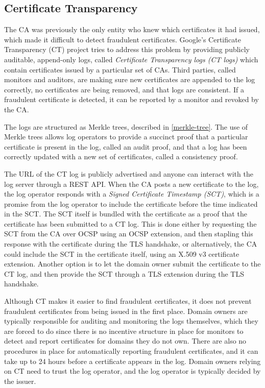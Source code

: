 \documentclass{style/kththesis}
\begin{document}
\subsection{Certificate Transparency}
The CA was previously the only entity who knew which certificates it had issued, which made it difficult to detect fraudulent certificates. Google's Certificate Transparency (CT) project \cite{RFC6962} tries to address this problem by providing publicly auditable, append-only logs, called \emph{Certificate Transparency logs (CT logs)} which contain certificates issued by a particular set of CAs. Third parties, called monitors and auditors, are making sure new certificates are appended to the log correctly, no certificates are being removed, and that logs are consistent. If a fraudulent certificate is detected, it can be reported by a monitor and revoked by the CA. 

The logs are structured as Merkle trees, described in \cref{merkle-tree}. The use of Merkle trees allows log operators to provide a succinct proof that a particular certificate is present in the log, called an audit proof, and that a log has been correctly updated with a new set of certificates, called a consistency proof.

The URL of the CT log is publicly advertised and anyone can interact with the log server through a REST API. When the CA posts a new certificate to the log, the log operator responds with a \emph{Signed Certificate Timestamp (SCT)}, which is a promise from the log operator to include the certificate before the time indicated in the SCT. The SCT itself is bundled with the certificate as a proof that the certificate has been submitted to a CT log. This is done either by requesting the SCT from the CA over OCSP using an OCSP extension, and then stapling this response with the certificate during the TLS handshake, or alternatively, the CA could include the SCT in the certificate itself, using an X.509 v3 certificate extension. Another option is to let the domain owner submit the certificate to the CT log, and then provide the SCT through a TLS extension during the TLS handshake.

Although CT makes it easier to find fraudulent certificates, it does not prevent fraudulent certificates from being issued in the first place. Domain owners are typically responsible for auditing and monitoring the logs themselves, which they are forced to do since there is no incentive structure in place for monitors to detect and report certificates for domains they do not own. There are also no procedures in place for automatically reporting fraudulent certificates, and it can take up to 24 hours before a certificate appears in the log. Domain owners relying on CT need to trust the log operator, and the log operator is typically decided by the issuer. 
\end{document}
